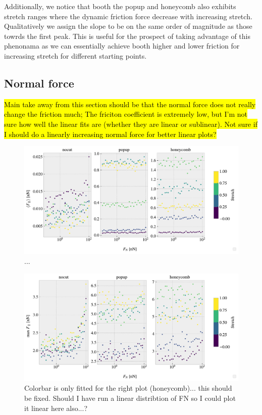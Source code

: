 Additionally, we notice that booth the popup and honeycomb also exhibits stretch ranges where the dynamic friction force decrease with increasing stretch. Qualitatively we assign the slope to be on the same order of magnitude as those towrds the first peak. This is useful for the prospect of taking advantage of this phenonama as we can essentially achieve booth higher and lower friction for increasing stretch for different starting points. 


\subsection{Normal force}

\hl{Main take away from this section should be that the normal force does not really change the friction much; The friciton coefficient is extremely low, but I'm not sure how well the linear fits are (whether they are linear or sublinear). Not sure if I should do a linearly increasing normal force for better linear plots?}

\begin{figure}[H]
  \centering
  \includegraphics[width=\linewidth]{figures/baseline/multi_FN_mean_compare.pdf}
  \caption{...}
  \label{fig:}
\end{figure}


\begin{figure}[H]
  \centering
  \includegraphics[width=\linewidth]{figures/baseline/multi_FN_max_compare.pdf}
  \caption{Colorbar is only fitted for the right plot (honeycomb)... this should be fixed. Should I have run a linear distribtion of FN so I could plot it linear here also...?}
  \label{fig:}
\end{figure}



